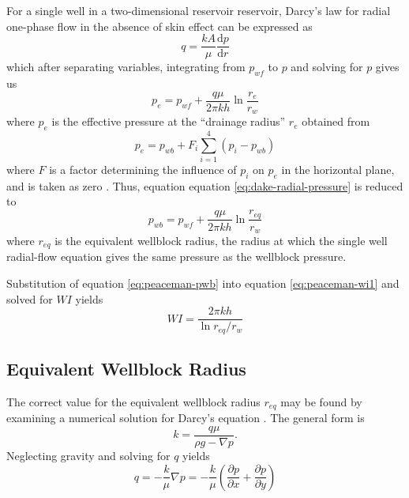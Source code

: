 For a single well in a two-dimensional reservoir reservoir, Darcy's law for radial one-phase flow in the absence of skin effect can be expressed as
\begin{equation}
    q = \frac{kA}{\mu} \frac{\mathrm{d}p}{\mathrm{d}r}
\end{equation}
which after separating variables, integrating from $p_{wf}$ to $p$ and solving for $p$ gives us
\begin{equation}
    \label{eq:dake-radial-pressure}
    p_e = p_{wf} + \frac{q\mu}{2\pi kh} \ln{\frac{r_e}{r_w}}
\end{equation}
where $p_e$ is the effective pressure at the ``drainage radius'' $r_e$ \cite{Dake1978Developments} obtained from
\begin{equation}
    \label{eq:peaceman-pe}
    p_e = p_{wb} + F_i \sum_{i=1}^{4}\left( p_i - p_{wb} \right)
\end{equation}
where $F$ is a factor determining the influence of $p_i$ on $p_e$ in the horizontal plane, and is taken as zero \cite{Schwabe1967Prediction,Peaceman1978Interpretation}. Thus, equation equation \eqref{eq:dake-radial-pressure} is reduced to
\begin{equation}
    \label{eq:peaceman-pwb}
    p_{wb} = p_{wf} + \frac{q\mu}{2\pi kh} \ln{\frac{r_{eq}}{r_w}}
\end{equation}
where $r_{eq}$ is the equivalent wellblock radius, the radius at which the single well radial-flow equation gives the same pressure as the wellblock pressure\cite{Peaceman1978Interpretation,Peaceman2003New}.

Substitution of equation \eqref{eq:peaceman-pwb} into equation \eqref{eq:peaceman-wi1} and solved for $WI$ yields
\begin{equation}
    \label{eq:peaceman-wi2}
    WI = \frac{2\pi kh}{\ln{r_{eq}/r_w}}
\end{equation}

\subsection{Equivalent Wellblock Radius} %
\label{sub:equivalent_wellblock_radius}
The correct value for the equivalent wellblock radius $r_{eq}$ may be found by examining a numerical solution for Darcy's equation \cite{Peaceman1978Interpretation}. The general form is \cite{Hubbert1956DarcyS}
\begin{equation}
    k = \frac{q\mu}{\rho g - \nabla p}.
\end{equation}
Neglecting gravity and solving for $q$ yields
\begin{equation}
    q = - \frac{k}{\mu} \nabla p = - \frac{k}{\mu} \left( \frac{\partial p}{\partial x} + \frac{\partial p}{\partial y} \right)
\end{equation}

